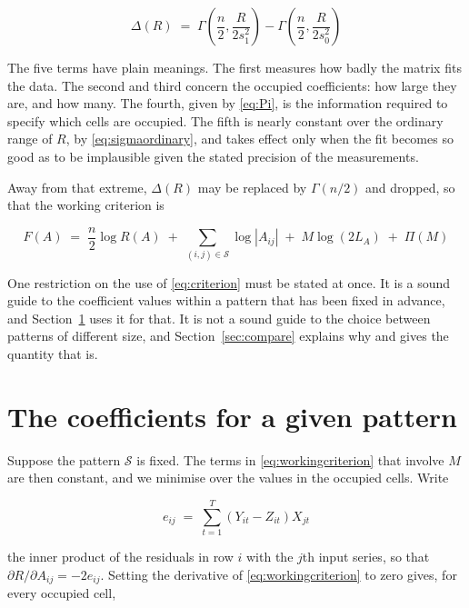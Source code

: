 \begin{equation}
\Delta(R) \;=\;
\Gamma\!\left( \frac{n}{2}, \frac{R}{2 s_{1}^{2}} \right)
- \Gamma\!\left( \frac{n}{2}, \frac{R}{2 s_{0}^{2}} \right)
\label{eq:Delta}
\end{equation}

The five terms have plain meanings. The first measures how badly the matrix fits the
data. The second and third concern the occupied coefficients: how large they are, and
how many. The fourth, given by \eqref{eq:Pi}, is the information required to specify which
cells are occupied.
The fifth is nearly constant over the ordinary range of $R$, by
\eqref{eq:sigmaordinary}, and takes effect only when the fit becomes so good as to be
implausible given the stated precision of the measurements.

Away from that extreme, $\Delta(R)$ may be replaced by $\Gamma(n/2)$ and dropped, so
that the working criterion is

\begin{equation}
F(A) \;=\;
\frac{n}{2} \log R(A)
\;+\; \sum_{(i,j) \in \mathcal{S}} \log |A_{ij}|
\;+\; M \log (2 L_{A})
\;+\; \Pi(M)
\label{eq:workingcriterion}
\end{equation}

One restriction on the use of \eqref{eq:criterion} must be stated at once. It is a
sound guide to the coefficient values within a pattern that has been fixed in
advance, and Section~\ref{sec:coefficients} uses it for that. It is not a sound guide
to the choice between patterns of different size, and Section~\ref{sec:compare}
explains why and gives the quantity that is.

\section{The coefficients for a given pattern}
\label{sec:coefficients}

Suppose the pattern $\mathcal{S}$ is fixed. The terms in
\eqref{eq:workingcriterion} that involve $M$ are then constant, and we minimise over
the values in the occupied cells. Write

\begin{equation}
e_{ij} \;=\; \sum_{t=1}^{T} \left( Y_{it} - Z_{it} \right) X_{jt}
\label{eq:eij}
\end{equation}

the inner product of the residuals in row $i$ with the $j$th input series, so that
$\partial R / \partial A_{ij} = -2 e_{ij}$. Setting the derivative of
\eqref{eq:workingcriterion} to zero gives, for every occupied cell,

